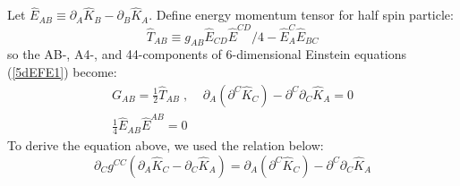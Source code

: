 \documentclass[twocolumn,showpacs,preprintnumbers,amsmath,amssymb]{revtex4}
\begin{document}
Let $\hat{E}_{AB} \equiv \partial_{A} \hat{K}_{B} - 
\partial_{B} \hat{K}_{A}$. 
Define energy momentum tensor for half spin particle: 
\begin{equation}
\hat{T}_{AB} \equiv g_{AB} \hat{E}_{CD} \hat{E}^{CD}/4 - \hat{E}_{A}^{C} \hat{E}_{BC}
\label{halfSpinT}
\end{equation}
so the AB-, A4-, and 44-components of 
6-dimensional Einstein equations (\ref{5dEFE1}) become:
\begin{eqnarray}
G_{AB} = \frac{1}{2} \hat{T}_{AB} \;, \; \; \; \;
\partial_{A} (\partial^{C} \hat{K}_{C}) - \partial^{C} \partial_{C} \hat{K}_{A} = 0   \nonumber \\
\frac{1}{4}\hat{E}_{AB} \hat{E}^{AB} = 0  
\label{halfspinEq}
\end{eqnarray}
To derive the equation above, we used the relation below:
\begin{equation}
\partial_{C} g^{CC} (\partial_{A} \hat{K}_{C} - \partial_{C} \hat{K}_{A} ) 
 = \partial_{A} (\partial^{C} \hat{K}_{C} ) - \partial^{C} \partial_{C} \hat{K}_{A} 
 \label{relation}
 \end{equation}
\end{document}
